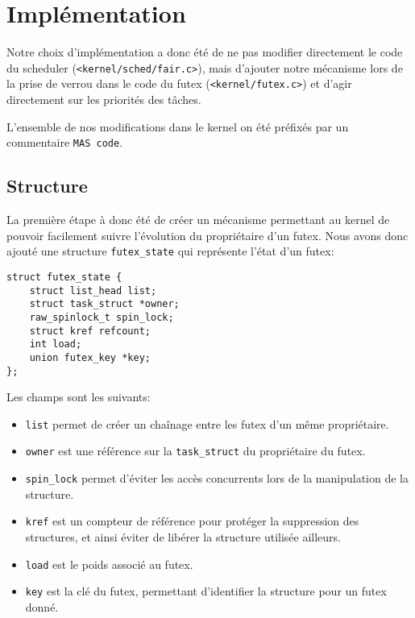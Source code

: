 \section{Implémentation}

Notre choix d'implémentation a donc été de ne pas modifier directement le code du scheduler (\verb|<kernel/sched/fair.c>|), mais d'ajouter notre mécanisme lors de la prise de
verrou dans le code
du futex (\verb|<kernel/futex.c>|) et d'agir directement sur les priorités des tâches.

L'ensemble de nos modifications dans le kernel on été préfixés par un commentaire \verb|MAS code|.

\subsection{Structure}

La première étape à donc été de créer un mécanisme permettant au kernel de pouvoir facilement
suivre l'évolution du propriétaire d'un futex.
Nous avons donc ajouté une structure \verb|futex_state| qui représente l'état d'un
futex:

\begin{lstlisting}[tabsize=4]
struct futex_state {
	struct list_head list;
	struct task_struct *owner;
	raw_spinlock_t spin_lock;
	struct kref refcount;
	int load;
	union futex_key *key;
};
\end{lstlisting}

Les champs sont les suivants:
\begin{itemize}
	\item \verb|list| permet de créer un chaînage entre les futex d'un même propriétaire.
	
	\item \verb|owner| est une référence sur la \verb|task_struct| du propriétaire du futex.
	
	\item \verb|spin_lock| permet d'éviter les accès concurrents lors de la manipulation de
	la structure.
	
	\item \verb|kref| est un compteur de référence pour protéger la suppression
	des structures, et ainsi éviter de libérer la structure utilisée ailleurs.
	
	\item \verb|load| est le poids associé au futex.
	
	\item \verb|key| est la clé du futex, permettant d'identifier la structure pour un 
	futex donné.
\end{itemize}
\hspace{1cm}

